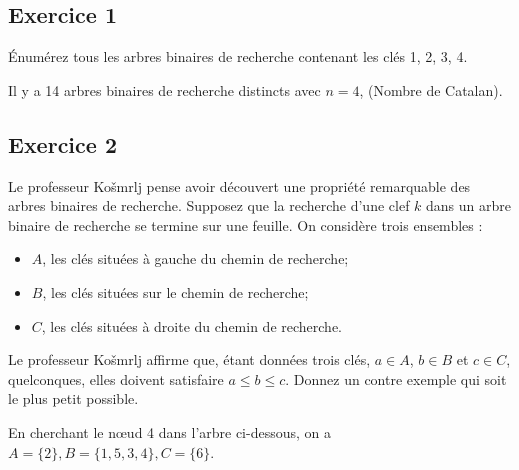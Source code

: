 \documentclass[iutinfo,a4paper,10pt]{ustl-tdtp}
\date{\annee{2017}--\annee{2018}}
\begin{document}
\maketitle
\thispagestyle{empty}

\subsection*{Exercice 1}
Énumérez tous les arbres binaires de recherche contenant les clés 1, 2, 3, 4.\\
\begin{solution}
{\color{red}
Il y a 14 arbres binaires de recherche distincts avec $n=4$, (Nombre de Catalan).
}
\end{solution}

\subsection*{Exercice 2}

Le professeur Ko\v smrlj pense avoir découvert une propriété remarquable des
arbres binaires de recherche. Supposez que la recherche d'une clef $k$ dans un
arbre binaire de recherche se termine sur une feuille. On considère trois
ensembles :
\begin{itemize}
\item $A$, les clés situées à gauche du chemin de recherche;
\item $B$, les clés situées sur le chemin de recherche;
\item $C$, les clés situées à droite du chemin de recherche.
\end{itemize}

Le professeur Ko\v smrlj affirme que, étant données trois clés, $a\in A$,
$b\in B$ et $c\in C$, quelconques, elles doivent satisfaire $a \leq b \leq c$.
Donnez un contre exemple qui soit le plus petit possible.

\begin{solution}
{\color{red}
En cherchant le n\oe ud 4 dans l'arbre ci-dessous, on a $A = \{2\}, B = \{1, 5 ,3, 4\}, C = \{6\}$.\\
}
\end{solution}
\end{document}
